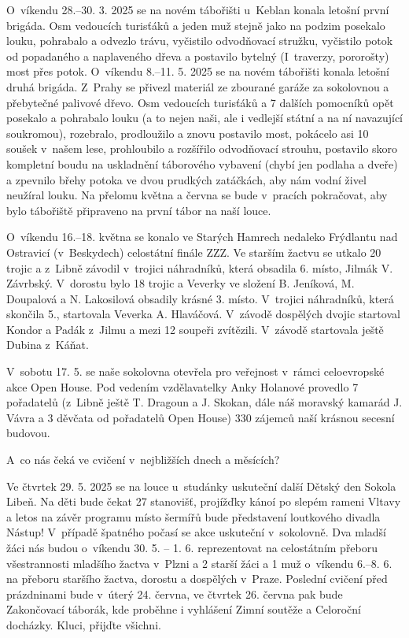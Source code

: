 \documentclass[11pt]{article}
\begin{document}
O~víkendu 28.--30. 3. 2025 se na novém tábořišti u~Keblan konala letošní
první
brigáda. Osm vedoucích turisťáků a jeden muž stejně jako na podzim
posekalo louku, pohrabalo a odvezlo trávu, vyčistilo odvodňovací
stružku,
vyčistilo potok od popadaného a naplaveného dřeva a postavilo bytelný
(I~traverzy, pororošty) most přes potok.
O~víkendu 8.--11. 5. 2025 se na novém tábořišti konala letošní
druhá brigáda. Z~Prahy se přivezl materiál ze zbourané garáže za
sokolovnou a přebytečné palivové dřevo. Osm vedoucích turisťáků a 7
dalších pomocníků opět posekalo a pohrabalo louku (a to nejen naši, ale
i
vedlejší státní a na ní navazující soukromou), rozebralo, prodloužilo a
znovu
postavilo most, pokácelo asi 10 soušek v~našem lese, prohloubilo a
rozšířilo
odvodňovací strouhu, postavilo skoro kompletní boudu na uskladnění
táborového vybavení (chybí jen podlaha a dveře) a zpevnilo břehy potoka
ve
dvou prudkých zatáčkách, aby nám vodní živel neužíral louku. Na přelomu
května a června se bude v~pracích pokračovat, aby bylo tábořiště
připraveno
na první tábor na naší louce.

O~víkendu 16.--18. května se konalo ve Starých Hamrech nedaleko
Frýdlantu nad Ostravicí (v~Beskydech) celostátní finále ZZZ. Ve starším
žactvu se utkalo 20 trojic a z~Libně závodil v~trojici náhradníků, která
obsadila 6. místo, Jilmák V. Závrbský. V~dorostu bylo 18 trojic a
Veverky ve
složení B. Jeníková, M. Doupalová a N. Lakosilová obsadily krásné 3.
místo. V~trojici náhradníků, která skončila 5., startovala Veverka
A. Hlaváčová. V~závodě dospělých dvojic startoval Kondor a Padák z~Jilmu
a mezi 12 soupeři zvítězili. V~závodě startovala ještě Dubina z~Káňat.

V~sobotu 17. 5. se naše sokolovna otevřela pro veřejnost v~rámci
celoevropské akce Open House. Pod vedením vzdělavatelky Anky
Holanové provedlo 7 pořadatelů (z~Libně ještě T. Dragoun a J. Skokan,
dále
náš moravský kamarád J. Vávra a 3 děvčata od pořadatelů Open House) 330
zájemců naší krásnou secesní budovou.

\clearpage
\noindent
A~co nás čeká ve cvičení v~nejbližších dnech a měsících?

Ve čtvrtek 29. 5. 2025 se na louce u~studánky uskuteční další Dětský den
Sokola Libeň. Na děti bude čekat 27 stanovišť, projížďky kánoí po slepém
rameni Vltavy a letos na závěr programu místo šermířů bude představení
loutkového divadla Nástup! V~případě špatného počasí se akce uskuteční
v~sokolovně.
Dva mladší žáci nás budou o~víkendu 30. 5. -- 1. 6. reprezentovat na
celostátním přeboru všestrannosti mladšího žactva v~Plzni a 2 starší
žáci a
1 muž o~víkendu 6.--8. 6. na přeboru staršího žactva, dorostu a
dospělých
v~Praze.
Poslední cvičení před prázdninami bude v~úterý 24. června, ve čtvrtek
26. června pak bude Zakončovací táborák, kde proběhne i
vyhlášení Zimní
soutěže a Celoroční docházky. Kluci, přijďte všichni.
\end{document}

